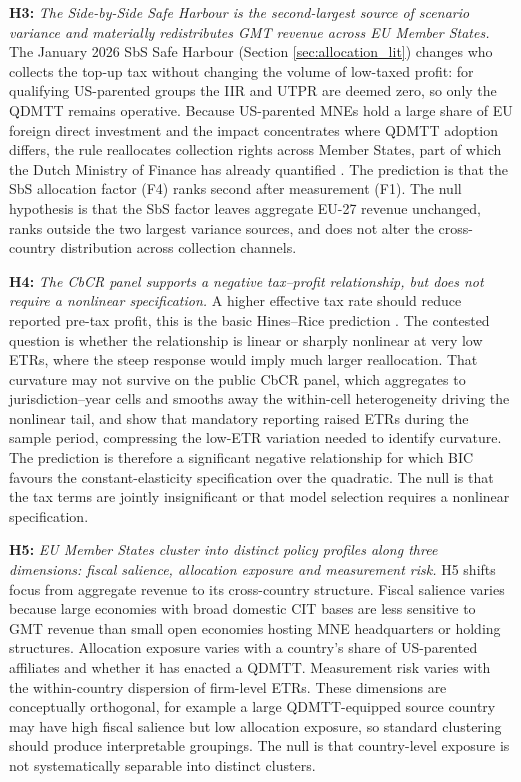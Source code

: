 \documentclass[11pt,a4paper]{article}
\newcommand{\hypothesis}[2]{\medskip\noindent\textbf{H#1:} \textit{#2}\smallskip}
\begin{document}
\hypothesis{3}{The Side-by-Side Safe Harbour is the second-largest source of scenario variance and materially redistributes GMT revenue across EU Member States.}
The January 2026 SbS Safe Harbour (Section \ref{sec:allocation_lit}) changes who collects the top-up tax without changing the volume of low-taxed profit: for qualifying US-parented groups the IIR and UTPR are deemed zero, so only the QDMTT remains operative. Because US-parented MNEs hold a large share of EU foreign direct investment \citep[\textit{cf.}][]{oecd2025} and the impact concentrates where QDMTT adoption differs, the rule reallocates collection rights across Member States, part of which the Dutch Ministry of Finance has already quantified \citep{1028}. The prediction is that the SbS allocation factor (F4) ranks second after measurement (F1). The null hypothesis is that the SbS factor leaves aggregate EU-27 revenue unchanged, ranks outside the two largest variance sources, and does not alter the cross-country distribution across collection channels.

\hypothesis{4}{The CbCR panel supports a negative tax--profit relationship, but does not require a nonlinear specification.}
A higher effective tax rate should reduce reported pre-tax profit, this is the basic Hines--Rice prediction \citep{heckemeyer2017,dowd2017,garcia-bernardo2024}. The contested question is whether the relationship is linear or sharply nonlinear at very low ETRs, where the steep \citet{dowd2017} response would imply much larger reallocation. That curvature may not survive on the public CbCR panel, which aggregates to jurisdiction--year cells and smooths away the within-cell heterogeneity driving the nonlinear tail, and \citet{tuinsma2025} show that mandatory reporting raised ETRs during the sample period, compressing the low-ETR variation needed to identify curvature. The prediction is therefore a significant negative relationship for which BIC favours the constant-elasticity specification over the quadratic. The null is that the tax terms are jointly insignificant or that model selection requires a nonlinear specification.

\hypothesis{5}{EU Member States cluster into distinct policy profiles along three dimensions: fiscal salience, allocation exposure and measurement risk.}
H5 shifts focus from aggregate revenue to its cross-country structure. Fiscal salience varies because large economies with broad domestic CIT bases are less sensitive to GMT revenue than small open economies hosting MNE headquarters or holding structures. Allocation exposure varies with a country's share of US-parented affiliates and whether it has enacted a QDMTT. Measurement risk varies with the within-country dispersion of firm-level ETRs. These dimensions are conceptually orthogonal, for example a large QDMTT-equipped source country may have high fiscal salience but low allocation exposure, so standard clustering should produce interpretable groupings. The null is that country-level exposure is not systematically separable into distinct clusters.
\end{document}
